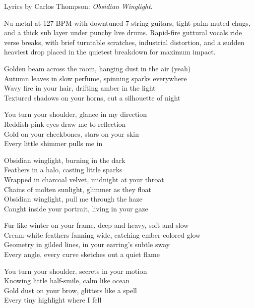 
\begin{notes}
Lyrics by Carlos Thompson: \emph{Obsidian Winglight}.
\end{notes}
\begin{style}
Nu-metal at 127 BPM with downtuned 7-string guitars, tight palm-muted chugs, and a thick sub layer under punchy live drums. Rapid-fire guttural vocals ride verse breaks, with brief turntable scratches, industrial distortion, and a sudden heaviest drop placed in the quietest breakdown for maximum impact.
\end{style}
\begin{lyrics}
Golden beam across the room, hanging dust in the air (yeah)\\
Autumn leaves in slow perfume, spinning sparks everywhere\\
Wavy fire in your hair, drifting amber in the light\\
Textured shadows on your horns, cut a silhouette of night

You turn your shoulder, glance in my direction\\
Reddish-pink eyes draw me to reflection\\
Gold on your cheekbones, stars on your skin\\
Every little shimmer pulls me in

Obsidian winglight, burning in the dark\\
Feathers in a halo, casting little sparks\\
Wrapped in charcoal velvet, midnight at your throat\\
Chains of molten sunlight, glimmer as they float\\
Obsidian winglight, pull me through the haze\\
Caught inside your portrait, living in your gaze

Fur like winter on your frame, deep and heavy, soft and slow\\
Cream-white feathers fanning wide, catching ember-colored glow\\
Geometry in gilded lines, in your earring’s subtle sway\\
Every angle, every curve sketches out a quiet flame

You turn your shoulder, secrets in your motion\\
Knowing little half-smile, calm like ocean\\
Gold dust on your brow, glitters like a spell\\
Every tiny highlight where I fell


\end{lyrics}
